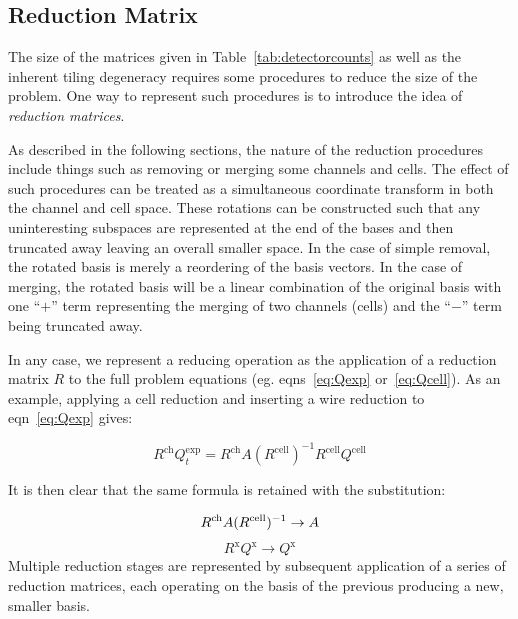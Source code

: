 \documentclass[letter]{article}
\begin{document}
\subsection{Reduction Matrix}

The size of the matrices given in Table~\ref{tab:detectorcounts} as
well as the inherent tiling degeneracy requires some procedures to
reduce the size of the problem.
One way to represent such procedures is to introduce the idea of
\textit{reduction matrices}.


As described in the following sections, the nature of the reduction
procedures include things such as removing or merging some channels
and cells.
The effect of such procedures can be treated as a simultaneous
coordinate transform in both the channel and cell space.
These rotations can be constructed such that any uninteresting
subspaces are represented at the end of the bases and then truncated
away leaving an overall smaller space.
In the case of simple removal, the rotated basis is merely a
reordering of the basis vectors.
In the case of merging, the rotated basis will be a linear combination
of the original basis with one ``$+$'' term representing the merging
of two channels (cells) and the ``$-$'' term being truncated away.

In any case, we represent a reducing operation as the application of a
reduction matrix $R$ to the full problem equations (eg. eqns~\ref{eq:Qexp} or~\ref{eq:Qcell}).
As an example, applying a cell reduction and inserting a wire
reduction to eqn~\ref{eq:Qexp} gives:

\begin{equation}
  \label{eq:contraction}
  R^\mathrm{ch} Q^\mathrm{exp}_t = 
R^\mathrm{ch} 
A (R^\mathrm{cell})^{-1} 
R^\mathrm{cell}  
Q^\mathrm{cell}
\end{equation}

\noindent It is then clear that the same formula is retained with the
substitution:

\begin{equation}
  \label{eq:subst}
  R^\mathrm{ch} A (R^\mathrm{cell})^{-1} \to A\\
\end{equation}
\begin{equation}
  \label{eq:subst2}
  R^\mathrm{x} Q^\mathrm{x} \to Q^\mathrm{x}
\end{equation}
Multiple reduction stages are represented by subsequent application of
a series of reduction matrices, each operating on the basis of the
previous producing a new, smaller basis.
\end{document}
